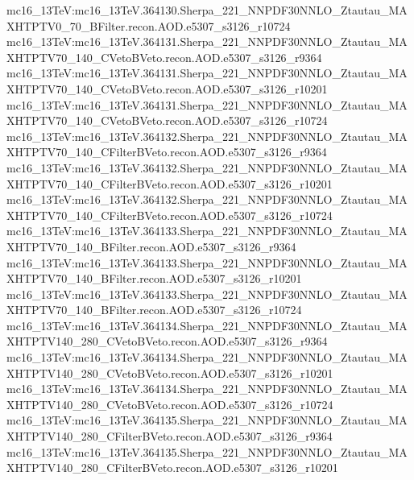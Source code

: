 { mc16\_13TeV:mc16\_13TeV.364130.Sherpa\_221\_NNPDF30NNLO\_Ztautau\_MAXHTPTV0\_70\_BFilter.recon.AOD.e5307\_s3126\_r10724   
 mc16\_13TeV:mc16\_13TeV.364131.Sherpa\_221\_NNPDF30NNLO\_Ztautau\_MAXHTPTV70\_140\_CVetoBVeto.recon.AOD.e5307\_s3126\_r9364   \newline 
 mc16\_13TeV:mc16\_13TeV.364131.Sherpa\_221\_NNPDF30NNLO\_Ztautau\_MAXHTPTV70\_140\_CVetoBVeto.recon.AOD.e5307\_s3126\_r10201 \newline 
 mc16\_13TeV:mc16\_13TeV.364131.Sherpa\_221\_NNPDF30NNLO\_Ztautau\_MAXHTPTV70\_140\_CVetoBVeto.recon.AOD.e5307\_s3126\_r10724 \newline   
 mc16\_13TeV:mc16\_13TeV.364132.Sherpa\_221\_NNPDF30NNLO\_Ztautau\_MAXHTPTV70\_140\_CFilterBVeto.recon.AOD.e5307\_s3126\_r9364 \newline   
 mc16\_13TeV:mc16\_13TeV.364132.Sherpa\_221\_NNPDF30NNLO\_Ztautau\_MAXHTPTV70\_140\_CFilterBVeto.recon.AOD.e5307\_s3126\_r10201  \newline  
 mc16\_13TeV:mc16\_13TeV.364132.Sherpa\_221\_NNPDF30NNLO\_Ztautau\_MAXHTPTV70\_140\_CFilterBVeto.recon.AOD.e5307\_s3126\_r10724\newline    
 mc16\_13TeV:mc16\_13TeV.364133.Sherpa\_221\_NNPDF30NNLO\_Ztautau\_MAXHTPTV70\_140\_BFilter.recon.AOD.e5307\_s3126\_r9364 \newline   
 mc16\_13TeV:mc16\_13TeV.364133.Sherpa\_221\_NNPDF30NNLO\_Ztautau\_MAXHTPTV70\_140\_BFilter.recon.AOD.e5307\_s3126\_r10201\newline    
 mc16\_13TeV:mc16\_13TeV.364133.Sherpa\_221\_NNPDF30NNLO\_Ztautau\_MAXHTPTV70\_140\_BFilter.recon.AOD.e5307\_s3126\_r10724   \newline 
 mc16\_13TeV:mc16\_13TeV.364134.Sherpa\_221\_NNPDF30NNLO\_Ztautau\_MAXHTPTV140\_280\_CVetoBVeto.recon.AOD.e5307\_s3126\_r9364  \newline  
 mc16\_13TeV:mc16\_13TeV.364134.Sherpa\_221\_NNPDF30NNLO\_Ztautau\_MAXHTPTV140\_280\_CVetoBVeto.recon.AOD.e5307\_s3126\_r10201 \newline  
 mc16\_13TeV:mc16\_13TeV.364134.Sherpa\_221\_NNPDF30NNLO\_Ztautau\_MAXHTPTV140\_280\_CVetoBVeto.recon.AOD.e5307\_s3126\_r10724 \newline   
 mc16\_13TeV:mc16\_13TeV.364135.Sherpa\_221\_NNPDF30NNLO\_Ztautau\_MAXHTPTV140\_280\_CFilterBVeto.recon.AOD.e5307\_s3126\_r9364\newline   
 mc16\_13TeV:mc16\_13TeV.364135.Sherpa\_221\_NNPDF30NNLO\_Ztautau\_MAXHTPTV140\_280\_CFilterBVeto.recon.AOD.e5307\_s3126\_r10201 \newline  
}
